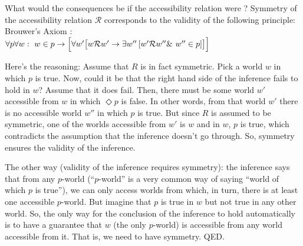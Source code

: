 \kwn
{}%
%
What would the consequences be if the accessibility relation were
? Symmetry of the accessibility relation $\mathcal{R}$
corresponds to the validity of the following principle:
%
\ex Brouwer's Axiom :\\
$\forall p \forall w:\ w\in p \rightarrow \Bigl[\forall w' \bigl[ w\mathcal{R}w'
\rightarrow \exists w'' \left[ w'\mathcal{R}w'' \&\ w''\in p\right]\bigr]\Bigr]$
\xe

Here's the reasoning: Assume that $R$ is in fact symmetric. Pick a world $w$ in
which $p$ is true. Now, could it be that the right hand side of the inference
fails to hold in $w$? Assume that it does fail. Then, there must be some world
$w'$ accessible from $w$ in which $\Diamond p$ is false. In other words,
from that world $w'$ there is no accessible world $w''$ in which $p$ is true.
But since $R$ is assumed to be symmetric, one of the worlds accessible from $w'$
is $w$ and in $w$, $p$ is true, which contradicts the assumption that the
inference doesn't go through. So, symmetry ensures the validity of the
inference.

%
The other way (validity of the inference requires symmetry): the inference says
that from any $p$-world (``$p$-world'' is a very common way of saying ``world of
which $p$ is true''), we can only access worlds from which, in turn, there is at
least one accessible $p$-world. But imagine that $p$ is true in $w$ but not true
in any other world. So, the only way for the conclusion of the inference to hold
automatically is to have a guarantee that $w$ (the only $p$-world) is accessible
from any world accessible from it. That is, we need to have symmetry. QED.

